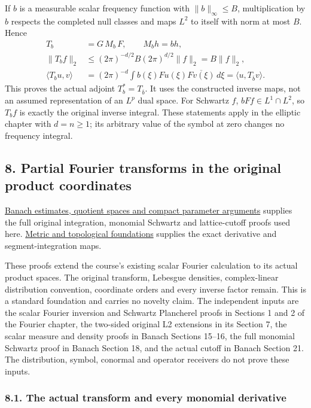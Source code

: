 \documentclass[
  11pt,
]{article}
\begin{document}
If \(b\) is a measurable scalar frequency function with
\(\|b\|_\infty\leq B\), multiplication by \(b\) respects the completed
null classes and maps \(L^2\) to itself with norm at most \(B\). Hence
\[
 \begin{split}
 T_b&=G\,M_b\,F,\qquad M_bh=bh,\\
 \|T_bf\|_2
 &\leq(2\pi)^{-d/2}B(2\pi)^{d/2}\|f\|_2=B\|f\|_2,\\
 \langle T_bu,v\rangle
 &=(2\pi)^{-d}\int b(\xi)Fu(\xi)\overline{Fv(\xi)}\,d\xi
   =\langle u,T_{\overline b}v\rangle .
 \end{split}                                                   \tag{FL6}
\] This proves the actual adjoint \(T_b^*=T_{\overline b}\). It uses the
constructed inverse maps, not an assumed representation of an \(L^p\)
dual space. For Schwartz \(f\), \(bFf\in L^1\cap L^2\), so \(T_bf\) is
exactly the original inverse integral. These statements apply in the
elliptic chapter with \(d=n\geq1\); its arbitrary value of the symbol at
zero changes no frequency integral.

\subsection{8. Partial Fourier transforms in the original product
coordinates}\label{partial-fourier-transforms-in-the-original-product-coordinates}

\href{banach-foundation-bridges.pdf}{Banach estimates, quotient spaces
and compact parameter arguments} supplies the full original integration,
monomial Schwartz and lattice-cutoff proofs used here.
\href{metric-foundation-bridges.pdf}{Metric and topological foundations}
supplies the exact derivative and segment-integration maps.

These proofs extend the course's existing scalar Fourier calculation to
its actual product spaces. The original transform, Lebesgue densities,
complex-linear distribution convention, coordinate orders and every
inverse factor remain. This is a standard foundation and carries no
novelty claim. The independent inputs are the scalar Fourier inversion
and Schwartz Plancherel proofs in Sections 1 and 2 of the Fourier
chapter, the two-sided original L2 extensions in its Section 7, the
scalar measure and density proofs in Banach Sections 15--16, the full
monomial Schwartz proof in Banach Section 18, and the actual cutoff in
Banach Section 21. The distribution, symbol, conormal and operator
receivers do not prove these inputs.

\subsubsection{8.1. The actual transform and every monomial
derivative}\label{the-actual-transform-and-every-monomial-derivative}
\end{document}
